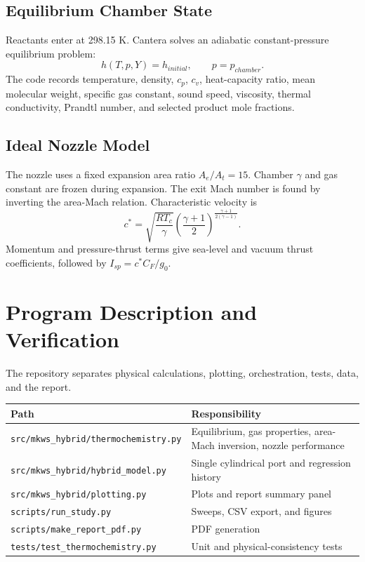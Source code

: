 \documentclass[10pt,a4paper]{article}
\begin{document}
\subsection{Equilibrium Chamber State}
Reactants enter at 298.15 K. Cantera solves an adiabatic constant-pressure equilibrium problem:
\[
h(T,p,Y)=h_{initial}, \qquad p=p_{chamber}.
\]
The code records temperature, density, $c_p$, $c_v$, heat-capacity ratio, mean molecular weight, specific gas constant, sound speed, viscosity, thermal conductivity, Prandtl number, and selected product mole fractions.

\subsection{Ideal Nozzle Model}
The nozzle uses a fixed expansion area ratio $A_e/A_t=15$. Chamber $\gamma$ and gas constant are frozen during expansion. The exit Mach number is found by inverting the area-Mach relation. Characteristic velocity is
\[
c^*=\sqrt{\frac{RT_c}{\gamma}}
\left(\frac{\gamma+1}{2}\right)^{\frac{\gamma+1}{2(\gamma-1)}}.
\]
Momentum and pressure-thrust terms give sea-level and vacuum thrust coefficients, followed by $I_{sp}=c^*C_F/g_0$.
\newpage

\section{Program Description and Verification}
The repository separates physical calculations, plotting, orchestration, tests, data, and the report.

\begin{tabular}{p{5.4cm}p{10.1cm}}
\toprule
Path & Responsibility \\
\midrule
\texttt{src/mkws\_hybrid/thermochemistry.py} & Equilibrium, gas properties, area-Mach inversion, nozzle performance \\
\texttt{src/mkws\_hybrid/hybrid\_model.py} & Single cylindrical port and regression history \\
\texttt{src/mkws\_hybrid/plotting.py} & Plots and report summary panel \\
\texttt{scripts/run\_study.py} & Sweeps, CSV export, and figures \\
\texttt{scripts/make\_report\_pdf.py} & PDF generation \\
\texttt{tests/test\_thermochemistry.py} & Unit and physical-consistency tests \\
\bottomrule
\end{tabular}
\end{document}
